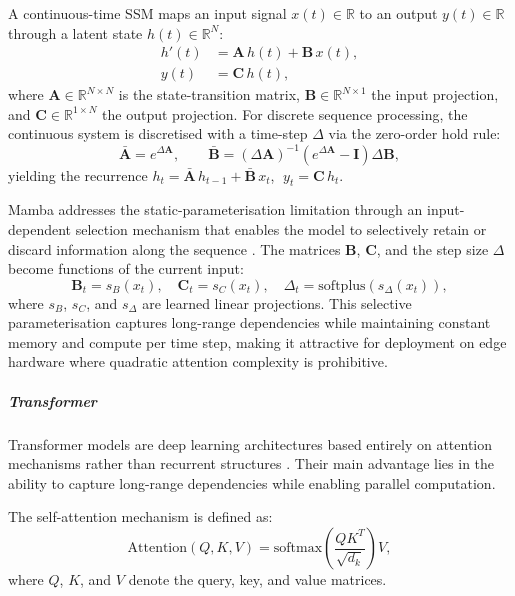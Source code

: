 A continuous-time SSM maps an input signal $x(t) \in \mathbb{R}$ to an output $y(t) \in \mathbb{R}$ through a latent state $h(t) \in \mathbb{R}^{N}$:
\begin{align}
h'(t) &= \mathbf{A}\,h(t) + \mathbf{B}\,x(t), \label{eq:ssm-cont}\\
y(t)  &= \mathbf{C}\,h(t),
\end{align}
where $\mathbf{A} \in \mathbb{R}^{N \times N}$ is the state-transition matrix, $\mathbf{B} \in \mathbb{R}^{N \times 1}$ the input projection, and $\mathbf{C} \in \mathbb{R}^{1 \times N}$ the output projection. For discrete sequence processing, the continuous system is discretised with a time-step $\Delta$ via the zero-order hold rule:
\begin{equation}
\bar{\mathbf{A}} = e^{\Delta \mathbf{A}}, \qquad
\bar{\mathbf{B}} = (\Delta \mathbf{A})^{-1}\!\left(e^{\Delta \mathbf{A}} - \mathbf{I}\right)\Delta \mathbf{B},
\end{equation}
yielding the recurrence $h_t = \bar{\mathbf{A}}\,h_{t-1} + \bar{\mathbf{B}}\,x_t$, $\; y_t = \mathbf{C}\,h_t$.

Mamba addresses the static-parameterisation limitation through an input-dependent selection mechanism that enables the model to selectively retain or discard information along the sequence \citep{gu2023mamba}. The matrices $\mathbf{B}$, $\mathbf{C}$, and the step size $\Delta$ become functions of the current input:
\begin{equation}
\mathbf{B}_t = s_B(x_t),\quad \mathbf{C}_t = s_C(x_t),\quad \Delta_t = \mathrm{softplus}\!\left(s_\Delta(x_t)\right),
\end{equation}
where $s_B$, $s_C$, and $s_\Delta$ are learned linear projections. This selective parameterisation captures long-range dependencies while maintaining constant memory and compute per time step, making it attractive for deployment on edge hardware where quadratic attention complexity is prohibitive.

\subparagraph{Transformer}

Transformer models are deep learning architectures based entirely on attention mechanisms rather than recurrent structures \citep{vaswani2017attention}. Their main advantage lies in the ability to capture long-range dependencies while enabling parallel computation.

The self-attention mechanism is defined as:
\begin{equation}
\text{Attention}(Q,K,V)=\text{softmax}\left(\frac{QK^T}{\sqrt{d_k}}\right)V,
\end{equation}
where $Q$, $K$, and $V$ denote the query, key, and value matrices.

